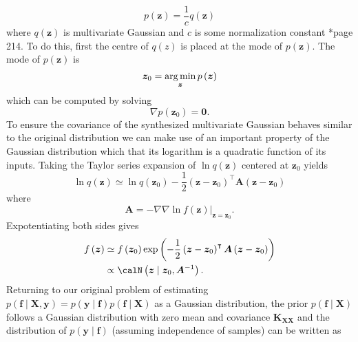 \begin{equation*}
    p \left( \bm{z} \right) = \frac{1}{c} q \left( \bm{z} \right)
\end{equation*}
where $q \left( \bm{z} \right)$ is multivariate Gaussian and $c$ is some normalization constant \cite{BishopChristopherM2006Pram}*{page 214}. To do this, first the centre of $q \left( z \right)$ is placed at the mode of $p \left( \bm{z} \right)$. The mode of $p \left( \bm{z} \right)$ is
\begin{equation*}
    \bm{z}_0 = \operatorname*{\arg\min}_{\bm{z}} p \left( \bm{z} \right)
\end{equation*}
which can be computed by solving
\begin{equation} \label{eq: lapace-grad-zero}
    \nabla p \left( \bm{z}_0 \right) = \bm{0}.
\end{equation}
To ensure the covariance of the synthesized multivariate Gaussian behaves similar to the original distribution we can make use of an important property of the Gaussian distribution which that its logarithm is a quadratic function of its inputs. Taking the Taylor series expansion of $\ln q \left( \bm{z} \right)$ centered at $\bm{z}_0$ yields
\begin{equation*}
    \ln q \left( \bm{z} \right) \simeq \ln q \left( \bm{z}_0 \right) - \frac{1}{2} \left( \bm{z} - \bm{z}_0 \right)^{\intercal} \bm{A} \left( \bm{z} - \bm{z}_0 \right)
\end{equation*}
where
\begin{equation*}
    \bm{A} = - \nabla \nabla \left. \ln f \left( \bm{z} \right) \right|_{\bm{z} = \bm{z}_0}.
\end{equation*}
Expotentiating both sides gives
\begin{align}
    f \left( \bm{z} \right)
     & \simeq f \left( \bm{z}_0 \right) \exp \left( - \frac{1}{2} \left( \bm{z} - \bm{z}_0 \right)^{\intercal} \bm{A} \left( \bm{z} - \bm{z}_0 \right) \right) \nonumber \\
     & \propto \calN \left( \bm{z} \mid \bm{z}_0 , \bm{A}^{-1} \right) \label{eq: lapace-gauss-apprx} .
\end{align}
Returning to our original problem of estimating $p \left( \bm{f} \mid \bm{X} , \bm{y} \right) = p \left( \bm{y} \mid \bm{f} \right) p \left( \bm{f} \mid \bm{X} \right)$ as a Gaussian distribution, the prior $p \left( \bm{f} \mid \bm{X} \right)$ follows a Gaussian distribution with zero mean and covariance $\bm{K}_{\bm{X} \bm{X}}$ and the distribution of $p \left( \bm{y} \mid \bm{f} \right)$ (assuming independence of samples) can be written as
